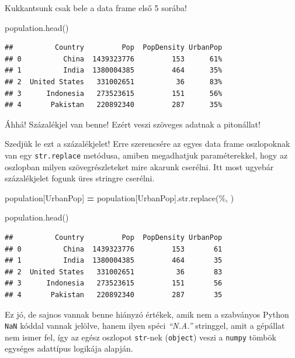 \documentclass[
]{book}
\newenvironment{Shaded}{\begin{snugshade}}{\end{snugshade}}
\newcommand{\BuiltInTok}[1]{#1}
\newcommand{\NormalTok}[1]{#1}
\newcommand{\OperatorTok}[1]{\textcolor[rgb]{0.81,0.36,0.00}{\textbf{#1}}}
\newcommand{\StringTok}[1]{\textcolor[rgb]{0.31,0.60,0.02}{#1}}
\begin{document}
Kukkantsunk csak bele a data frame első 5 sorába!

\begin{Shaded}
\begin{Highlighting}[]
\NormalTok{population.head()}
\end{Highlighting}
\end{Shaded}

\begin{verbatim}
##          Country         Pop  PopDensity UrbanPop
## 0          China  1439323776         153      61%
## 1          India  1380004385         464      35%
## 2  United States   331002651          36      83%
## 3      Indonesia   273523615         151      56%
## 4       Pakistan   220892340         287      35%
\end{verbatim}

Áhhá! Százalékjel van benne! Ezért veszi szöveges adatnak a pitonállat!

Szedjük le ezt a százalékjelet! Erre szerencsére az egyes data frame oszlopoknak van egy \texttt{str.replace} metódusa, amiben megadhatjuk paraméterekkel, hogy az oszlopban milyen szövegrészleteket mire akarunk cserélni. Itt most ugyebár százalékjelet fogunk üres stringre cserélni.

\begin{Shaded}
\begin{Highlighting}[]
\NormalTok{population[}\StringTok{\textquotesingle{}UrbanPop\textquotesingle{}}\NormalTok{] }\OperatorTok{=}\NormalTok{ population[}\StringTok{\textquotesingle{}UrbanPop\textquotesingle{}}\NormalTok{].}\BuiltInTok{str}\NormalTok{.replace(}\StringTok{\textquotesingle{}\%\textquotesingle{}}\NormalTok{, }\StringTok{\textquotesingle{}\textquotesingle{}}\NormalTok{)}

\NormalTok{population.head()}
\end{Highlighting}
\end{Shaded}

\begin{verbatim}
##          Country         Pop  PopDensity UrbanPop
## 0          China  1439323776         153       61
## 1          India  1380004385         464       35
## 2  United States   331002651          36       83
## 3      Indonesia   273523615         151       56
## 4       Pakistan   220892340         287       35
\end{verbatim}

Ez jó, de sajnos vannak benne hiányzó értékek, amik nem a szabványos Python \texttt{NaN} kóddal vannak jelölve, hanem ilyen spéci \emph{``N.A.''} stringgel, amit a gépállat nem ismer fel, így az egész oszlopot \texttt{str}-nek (\texttt{object}) veszi a \texttt{numpy} tömbök egységes adattípus logikája alapján.
\end{document}
